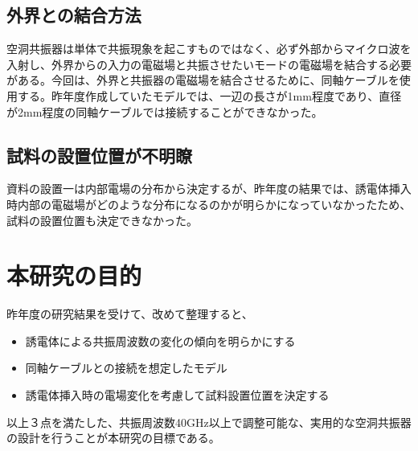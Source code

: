 \subsection{外界との結合方法}
空洞共振器は単体で共振現象を起こすものではなく、必ず外部からマイクロ波を入射し、外界からの入力の電磁場と共振させたいモードの電磁場を結合する必要がある。今回は、外界と共振器の電磁場を結合させるために、同軸ケーブルを使用する。昨年度作成していたモデルでは、一辺の長さが1mm程度であり、直径が2mm程度の同軸ケーブルでは接続することができなかった。

\subsection{試料の設置位置が不明瞭}
資料の設置一は内部電場の分布から決定するが、昨年度の結果では、誘電体挿入時内部の電磁場がどのような分布になるのかが明らかになっていなかったため、試料の設置位置も決定できなかった。

\section{本研究の目的}
昨年度の研究結果を受けて、改めて整理すると、

\begin{itemize}
  \item 誘電体による共振周波数の変化の傾向を明らかにする
  \item 同軸ケーブルとの接続を想定したモデル
  \item 誘電体挿入時の電場変化を考慮して試料設置位置を決定する
\end{itemize}

以上３点を満たした、共振周波数40GHz以上で調整可能な、実用的な空洞共振器の設計を行うことが本研究の目標である。
